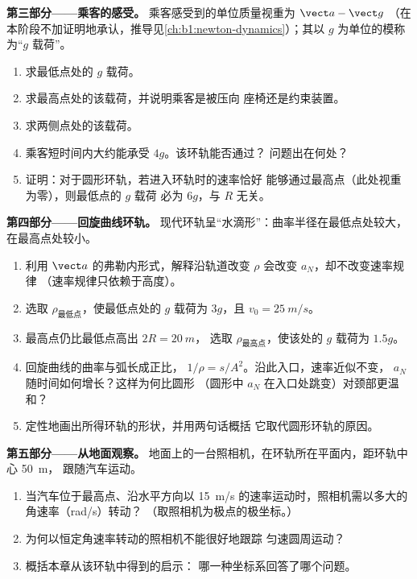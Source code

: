\begin{problem}
\medskip
\noindent\textbf{第三部分——乘客的感受。}
乘客感受到的单位质量视重为 $\vect a - \vect g$
（在本阶段不加证明地承认，推导见\cref{ch:b1:newton-dynamics}）；其以
$g$ 为单位的模称为“$g$ 载荷”。
\begin{enumerate}[resume]
  \item 求最低点处的 $g$ 载荷。
  \item 求最高点处的该载荷，并说明乘客是被压向
        座椅还是约束装置。
  \item 求两侧点处的该载荷。
  \item 乘客短时间内大约能承受 $4g$。该环轨能否通过？
        问题出在何处？
  \item 证明：对于圆形环轨，若进入环轨时的速率恰好
        能够通过最高点（此处视重为零），则最低点的 $g$ 载荷
        必为 $6g$，与 $R$ 无关。
\end{enumerate}

\medskip
\noindent\textbf{第四部分——回旋曲线环轨。}
现代环轨呈“水滴形”：曲率半径在最低点处较大，
在最高点处较小。
\begin{enumerate}[resume]
  \item 利用 $\vect a$ 的弗勒内形式，解释沿轨道改变
        $\rho$ 会改变 $a_N$，却不改变速率规律
        （速率规律只依赖于高度）。
  \item 选取 $\rho_{\text{最低点}}$，使最低点处的 $g$ 载荷为
        $3g$，且 $v_0 = \qty{25}{m/s}$。
  \item 最高点仍比最低点高出 $2R = \qty{20}{m}$，
        选取 $\rho_{\text{最高点}}$，使该处的 $g$ 载荷为
        $1.5g$。
  \item 回旋曲线的曲率与弧长成正比，
        $1/\rho = s/A^2$。沿此入口，速率近似不变，
        $a_N$ 随时间如何增长？这样为何比圆形
        （圆形中 $a_N$ 在入口处跳变）对颈部更温和？
  \item 定性地画出所得环轨的形状，并用两句话概括
        它取代圆形环轨的原因。
\end{enumerate}

\medskip
\noindent\textbf{第五部分——从地面观察。}
地面上的一台照相机，在环轨所在平面内，距环轨中心 \qty{50}{m}，
跟随汽车运动。
\begin{enumerate}[resume]
  \item 当汽车位于最高点、沿水平方向以
        \qty{15}{m/s} 的速率运动时，照相机需以多大的角速率（rad/s）转动？
        （取照相机为极点的极坐标。）
  \item 为何以恒定角速率转动的照相机不能很好地跟踪
        匀速圆周运动？
  \item 概括本章从该环轨中得到的启示：
        哪一种坐标系回答了哪个问题。
\end{enumerate}
\end{problem}
